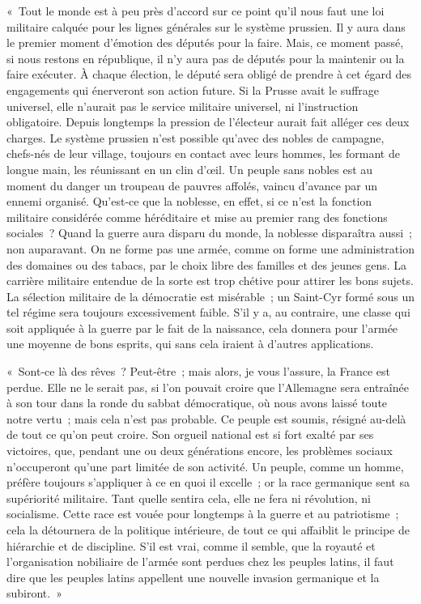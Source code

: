 \documentclass[french,twoside]{book} %
\newenvironment{quoteblock}%
  {\begin{quoting}}
  {\end{quoting}}
\newenvironment{quotebar}{%
    \def\FrameCommand{{\color{rubric!10!}\vrule width 0.5em} \hspace{0.9em}}%
    \def\OuterFrameSep{\itemsep} %
    \MakeFramed {\advance\hsize-\width \FrameRestore}
  }%
  {%
    \endMakeFramed
  }
\renewenvironment{quoteblock}%
  {%
    \savenotes
    \setstretch{0.9}
    \normalfont
    \begin{quotebar}
  }
  {%
    \end{quotebar}
    \spewnotes
  }
\begin{document}
\begin{quoteblock}
 « Tout le monde est à peu près d’accord sur ce point qu’il nous faut une loi militaire calquée pour les lignes générales sur le système prussien. Il y aura dans le premier moment d’émotion des députés pour la faire. Mais, ce moment passé, si nous restons en république, il n’y aura pas de députés pour la maintenir ou la faire exécuter. À chaque élection, le député sera obligé de prendre à cet égard des engagements qui énerveront son action future. Si la Prusse avait le suffrage universel, elle n’aurait pas le service militaire universel, ni l’instruction obligatoire. Depuis longtemps la pression de l’électeur aurait fait alléger ces deux charges. Le système prussien n’est possible qu’avec des nobles de campagne, chefs-nés de leur village, toujours en contact avec leurs hommes, les formant de longue main, les réunissant en un clin d’œil. Un peuple sans nobles est au moment du danger un troupeau de pauvres affolés, vaincu d’avance par un ennemi organisé. Qu’est-ce que la noblesse, en effet, si ce n’est la fonction militaire considérée comme héréditaire et mise au premier rang des fonctions sociales ? Quand la guerre aura disparu du monde, la noblesse disparaîtra aussi ; non auparavant. On ne forme pas une armée, comme on forme une administration des domaines ou des tabacs, par le choix libre des familles et des jeunes gens. La carrière militaire entendue de la sorte est trop chétive pour attirer les bons sujets. La sélection militaire de la démocratie est misérable ; un Saint-Cyr formé sous un tel régime sera toujours excessivement faible. S’il y a, au contraire, une classe qui soit appliquée à la guerre par le fait de la naissance, cela donnera pour l’armée une moyenne de bons esprits, qui sans cela iraient à d’autres applications.\par
 « Sont-ce là des rêves ? Peut-être ; mais alors, je vous l’assure, la France est perdue. Elle ne le serait pas, si l’on pouvait croire que l’Allemagne sera entraînée à son tour dans la ronde du sabbat démocratique, où nous avons laissé toute notre vertu ; mais cela n’est pas probable. Ce peuple est soumis, résigné au-delà de tout ce qu’on peut croire. Son orgueil national est si fort exalté par ses victoires, que, pendant une ou deux générations encore, les problèmes sociaux n’occuperont qu’une part limitée de son activité. Un peuple, comme un homme, préfère toujours s’appliquer à ce en quoi il excelle ; or la race germanique sent sa supériorité militaire. Tant quelle sentira cela, elle ne fera ni révolution, ni socialisme. Cette race est vouée pour longtemps à la guerre et au patriotisme ; cela la détournera de la politique intérieure, de tout ce qui affaiblit le principe de hiérarchie et de discipline. S’il est vrai, comme il semble, que la royauté et l’organisation nobiliaire de l’armée sont perdues chez les peuples latins, il faut dire que les peuples latins appellent une nouvelle invasion germanique et la subiront. » 
 \end{quoteblock}
\end{document}
